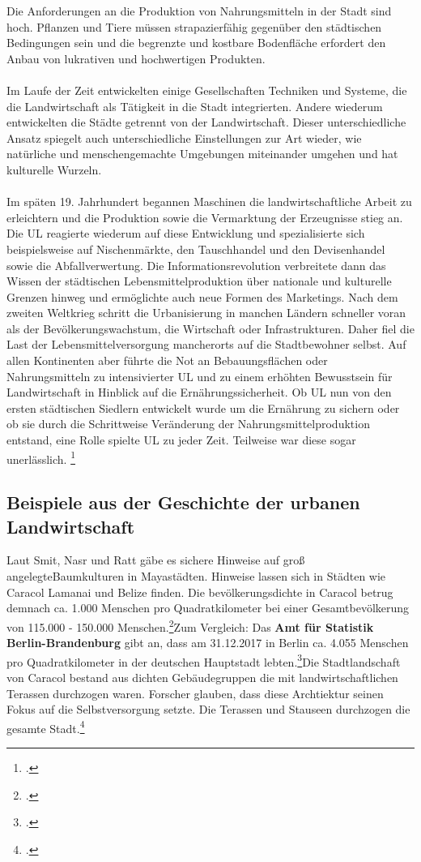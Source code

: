 \documentclass{scrartcl}
\begin{document}
Die Anforderungen an die Produktion von Nahrungsmitteln in der Stadt sind hoch. Pflanzen und Tiere müssen strapazierfähig gegenüber den städtischen Bedingungen sein und die begrenzte und kostbare Bodenfläche erfordert den Anbau von lukrativen und hochwertigen Produkten.\\ 
\\
Im Laufe der Zeit entwickelten einige Gesellschaften Techniken und Systeme, die die Landwirtschaft als Tätigkeit in die Stadt integrierten. Andere wiederum entwickelten die Städte getrennt von der Landwirtschaft. Dieser unterschiedliche Ansatz spiegelt auch unterschiedliche Einstellungen zur Art wieder, wie natürliche und menschengemachte Umgebungen miteinander umgehen und hat kulturelle Wurzeln.\\
\\
Im späten 19. Jahrhundert begannen Maschinen die landwirtschaftliche Arbeit zu erleichtern und die Produktion sowie die Vermarktung der Erzeugnisse stieg an. Die UL reagierte wiederum auf diese Entwicklung und spezialisierte sich beispielsweise auf Nischenmärkte, den Tauschhandel und den Devisenhandel sowie die Abfallverwertung. Die Informationsrevolution verbreitete dann das Wissen der städtischen Lebensmittelproduktion über nationale und kulturelle Grenzen hinweg und ermöglichte auch neue Formen des Marketings. Nach dem zweiten Weltkrieg schritt die Urbanisierung in manchen Ländern schneller voran als der Bevölkerungswachstum, die Wirtschaft oder Infrastrukturen. Daher fiel die Last der Lebensmittelversorgung mancherorts auf die Stadtbewohner selbst. Auf allen Kontinenten aber führte die Not an Bebauungsflächen oder Nahrungsmitteln zu intensivierter UL und zu einem erhöhten Bewusstsein für Landwirtschaft in Hinblick auf die Ernährungssicherheit. Ob UL nun von den ersten städtischen Siedlern entwickelt wurde um die Ernährung zu sichern oder ob sie durch die Schrittweise Veränderung der Nahrungsmittelproduktion entstand, eine Rolle spielte UL zu jeder Zeit. Teilweise war diese sogar unerlässlich.  \footcite[Vgl.][S. 1-4]{Smit2001UrbanCities}

\subsection{Beispiele aus der Geschichte der urbanen Landwirtschaft}


Laut Smit, Nasr und Ratt gäbe es sichere Hinweise auf groß angelegteBaumkulturen in Mayastädten. Hinweise lassen sich in Städten wie Caracol Lamanai und Belize finden. Die bevölkerungsdichte in Caracol betrug demnach ca. 1.000 Menschen pro Quadratkilometer bei einer Gesamtbevölkerung von 115.000 - 150.000 Menschen.\footcite[Vgl.][S. 5-6]{Smit2001UrbanCities}Zum Vergleich: Das \textbf{Amt für Statistik Berlin-Brandenburg} gibt an, dass am 31.12.2017 in Berlin ca. 4.055 Menschen pro Quadratkilometer in der deutschen Hauptstadt lebten.\footcite[Vgl.]{AmtfurStatistikBerlin-Brandenburg2017NoTitle}Die Stadtlandschaft von Caracol bestand aus dichten Gebäudegruppen die mit landwirtschaftlichen Terassen durchzogen waren. Forscher glauben, dass diese Archtiektur seinen Fokus auf die Selbstversorgung setzte. Die Terassen und Stauseen durchzogen die gesamte Stadt.\footcite[Vgl.][S. 5-6]{Smit2001UrbanCities}
\end{document}

